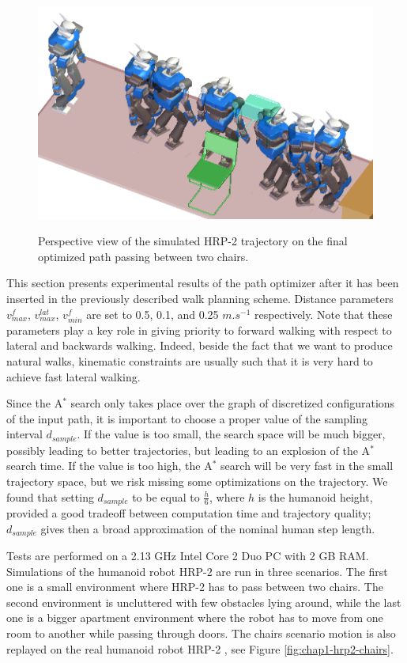 \begin{figure}
  \centering
      {\includegraphics[width = 0.8\linewidth]
        {src/chap1-path-optimization/chairs-hash-optim-perspective-hrp2.png}}
      \caption{Perspective view of the simulated HRP-2 trajectory on
        the final optimized path passing between two chairs.}
      \label{fig:chap1-chairs-hash-optim-perspective-hrp2}
\end{figure}

This section presents experimental results of the path optimizer after
it has been inserted in the previously described walk planning
scheme. Distance parameters $v_{max}^f$, $v_{max}^{lat}$, $v_{min}^f$
are set to 0.5, 0.1, and 0.25 $m.s^{-1}$ respectively. Note that these
parameters play a key role in giving priority to forward walking with
respect to lateral and backwards walking. Indeed, beside the fact that
we want to produce natural walks, kinematic constraints are usually
such that it is very hard to achieve fast lateral walking.

Since the A$^{*}$ search only takes place over the graph of
discretized configurations of the input path, it is important to
choose a proper value of the sampling interval $d_{sample}$. If the
value is too small, the search space will be much bigger, possibly
leading to better trajectories, but leading to an explosion of the
A$^{*}$ search time. If the value is too high, the A$^{*}$ search will
be very fast in the small trajectory space, but we risk missing some
optimizations on the trajectory. We found that setting $d_{sample}$ to
be equal to $\frac{h}{6}$, where $h$ is the humanoid height, provided
a good tradeoff between computation time and trajectory quality;
$d_{sample}$ gives then a broad approximation of the nominal human
step length.

Tests are performed on a 2.13 GHz Intel Core 2 Duo PC with 2 GB RAM.
Simulations of the humanoid robot HRP-2 are run in three scenarios.
The first one is a small environment where HRP-2 has to pass between
two chairs. The second environment is uncluttered with few obstacles
lying around, while the last one is a bigger apartment environment
where the robot has to move from one room to another while passing
through doors. The chairs scenario motion is also replayed on the real
humanoid robot HRP-2 \cite{kane04}, see Figure
\ref{fig:chap1-hrp2-chairs}.

